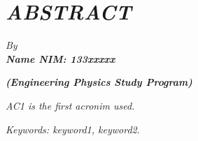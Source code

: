 \clearpage
\chapter*{\textit{ABSTRACT}}

\begin{center}
	\begin{singlespace}
		\center
		\large\bfseries\MakeUppercase{\textit{\thetitle}}
		
		\normalfont\normalsize
		
		\textit{By}\\
		\bfseries{\textit{Name \hspace{5mm} NIM: 133xxxxx}}
		
		\vspace{5mm}
		\large\bfseries{\textit{(Engineering Physics Study Program)}}
		\vspace{5mm}
	\end{singlespace}
\end{center}


\begin{singlespace}
	\small
	\textit{\acf{AC1} is the first acronim used. \lipsum[1]
	}
	
	\textit{Keywords: keyword1, keyword2}.
\end{singlespace}
\clearpage

\clearpage
